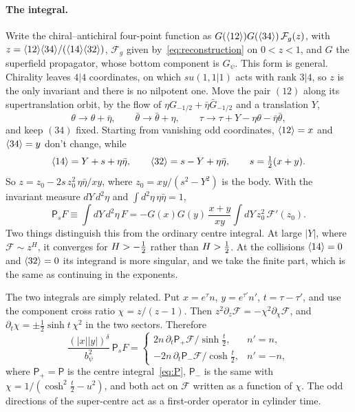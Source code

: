\paragraph{The integral.} Write the chiral--antichiral four-point function as $G(\langle 12\rangle)G(\langle 34\rangle)\,\mathcal F_g(z)$, with $z=\langle 12\rangle\langle 34\rangle/(\langle 14\rangle\langle 32\rangle)$, $\mathcal F_g$ given by~\eqref{eq:reconstruction} on $0<z<1$, and $G$ the superfield propagator, whose bottom component is $G_\psi$. This form is general. Chirality leaves $4|4$ coordinates, on which $su(1,1|1)$ acts with rank $3|4$, so $z$ is the only invariant and there is no nilpotent one. Move the pair $(12)$ along its supertranslation orbit, by the flow of $\eta G_{-1/2}+\bar\eta\bar G_{-1/2}$ and a translation $Y$,
\begin{equation}
\theta\to\theta+\bar\eta,\qquad\bar\theta\to\bar\theta+\eta,\qquad\tau\to\tau+Y-\eta\theta-\bar\eta\bar\theta,
\end{equation}
and keep $(34)$ fixed. Starting from vanishing odd coordinates, $\langle 12\rangle=x$ and $\langle 34\rangle=y$ don't change, while
\begin{equation}
\langle 14\rangle=Y+s+\eta\bar\eta,\qquad\langle 32\rangle=s-Y+\eta\bar\eta,\qquad s=\tfrac12(x+y).
\end{equation}
So $z=z_0-2s\,z_0^2\,\eta\bar\eta/xy$, where $z_0=xy/(s^2-Y^2)$ is the body. With the invariant measure $dY\,d^2\eta$ and $\int d^2\eta\,\eta\bar\eta=1$,
\begin{equation}\label{eq:Ps}
\mathsf P_sF\equiv\int dY\,d^2\eta\,F=-G(x)G(y)\,\frac{x+y}{xy}\int dY\,z_0^2\,\mathcal F'(z_0).
\end{equation}
Two things distinguish this from the ordinary centre integral. At large $|Y|$, where $\mathcal F\sim z^H$, it converges for $H>-\tfrac12$ rather than $H>\tfrac12$. At the collisions $\langle 14\rangle=0$ and $\langle 32\rangle=0$ its integrand is more singular, and we take the finite part, which is the same as continuing in the exponents.

The two integrals are simply related. Put $x=e^\tau n$, $y=e^{\tau'}n'$, $t=\tau-\tau'$, and use the component cross ratio $\chi=z/(z-1)$. Then $z^2\partial_z\mathcal F=-\chi^2\partial_\chi\mathcal F$, and $\partial_t\chi=\pm\frac12\sinh t\,\chi^2$ in the two sectors. Therefore
\begin{equation}\label{eq:Ps-P}
\frac{(|x||y|)^\delta}{b_\psi^2}\,\mathsf P_sF=\begin{cases}2n\,\partial_t\mathsf P_+\mathcal F/\sinh\frac t2,&n'=n,\\[0.5ex]-2n\,\partial_t\mathsf P_-\mathcal F/\cosh\frac t2,&n'=-n,\end{cases}
\end{equation}
where $\mathsf P_+=\mathsf P$ is the centre integral~\eqref{eq:P}, $\mathsf P_-$ is the same with $\chi=1/(\cosh^2\frac t2-u^2)$, and both act on $\mathcal F$ written as a function of $\chi$. The odd directions of the super-centre act as a first-order operator in cylinder time.

